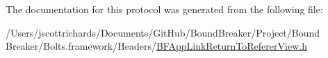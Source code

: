 The documentation for this protocol was generated from the following file\+:\begin{DoxyCompactItemize}
\item 
/\+Users/jscottrichards/\+Documents/\+Git\+Hub/\+Bound\+Breaker/\+Project/\+Bound Breaker/\+Bolts.\+framework/\+Headers/\hyperlink{_b_f_app_link_return_to_referer_view_8h}{B\+F\+App\+Link\+Return\+To\+Referer\+View.\+h}\end{DoxyCompactItemize}
